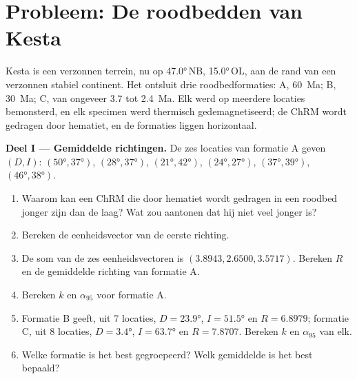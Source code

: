 \section{Probleem: De roodbedden van Kesta}

\begin{problem}
\label{pb:b3:palaeomagnetism:1}
Kesta is een verzonnen terrein, nu op \ang{47.0}\,NB, \ang{15.0}\,OL, aan de rand
van een verzonnen stabiel continent. Het ontsluit drie roodbedformaties: A,
\qty{60}{Ma}; B, \qty{30}{Ma}; C, van ongeveer 3.7 tot \qty{2.4}{Ma}. Elk werd
op meerdere locaties bemonsterd, en elk specimen werd thermisch gedemagnetiseerd; de
ChRM wordt gedragen door hematiet, en de formaties liggen horizontaal.

\medskip\noindent\textbf{Deel I --- Gemiddelde richtingen.} De zes locaties van
formatie A geven $(D, I)$: $(\ang{50}, \ang{37})$, $(\ang{28}, \ang{37})$,
$(\ang{21}, \ang{42})$, $(\ang{24}, \ang{27})$, $(\ang{37}, \ang{39})$,
$(\ang{46}, \ang{38})$.
\begin{enumerate}
  \item Waarom kan een ChRM die door hematiet wordt gedragen in een roodbed jonger zijn dan de
        laag? Wat zou aantonen dat hij niet veel jonger is?
  \item Bereken de eenheidsvector van de eerste richting.
  \item De som van de zes eenheidsvectoren is $(3.8943, 2.6500, 3.5717)$. Bereken $R$ en
        de gemiddelde richting van formatie A.
  \item Bereken $k$ en $\alpha_{95}$ voor formatie A.
  \item Formatie B geeft, uit 7 locaties, $D = \ang{23.9}$, $I = \ang{51.5}$ en
        $R = 6.8979$; formatie C, uit 8 locaties, $D = \ang{3.4}$, $I =
        \ang{63.7}$ en $R = 7.8707$. Bereken $k$ en $\alpha_{95}$ van elk.
  \item Welke formatie is het best gegroepeerd? Welk gemiddelde is het best bepaald?
\end{enumerate}


\end{problem}
